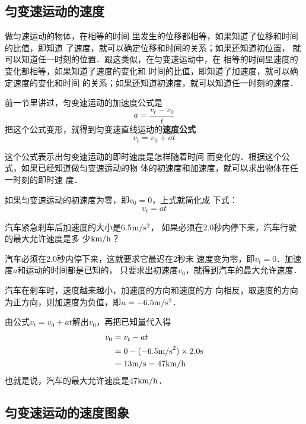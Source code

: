     \subsection{匀变速运动的速度}

做匀速运动的物体，在相等的时间
里发生的位移都相等，如果知道了位移和时间的比值，即知道
了速度，就可以确定位移和时间的关系；如果还知道初位置，
就可以知道任一时刻的位置．跟这类似，在匀变速运动中，在
相等的时间里速度的变化都相等，如果知道了速度的变化和
时间的比值，即知道了加速度，就可以确定速度的变化和时间
的关系；如果还知道初速度，就可以知道任一时刻的速度．

    前一节里讲过，匀变速运动的加速度公式是
\[a=\frac{v_t-v_0}{t} \]
把这个公式变形，就得到匀变速直线运动的\textbf{速度公式}
\[v_t=v_0+at \]

    这个公式表示出匀变速运动的即时速度是怎样随着时间
而变化的．根据这个公式，如果已经知道做匀变速运动的物
体的初速度和加速度，就可以求出物体在任一时刻的即时速
度．

    如果匀变速运动的初速度为零，即$v_0=0$，上式就简化成
下式：
\[v_t=at \]


\begin{example}
汽车紧急刹车后加速度的大小是6.5$\text{m}/\text{s}^2$，
如果必须在2.0秒内停下来，汽车行驶的最大允许速度是多
少$\text{km}/\text{h}$？
\end{example}

\begin{solution}
    汽车必须在2.0秒内停下来，这就要求它最迟在2秒末
速度变为零，即$v_t=0$．加速度$a$和运动的时间都是已知的，
只要求出初速度$v_0$，就得到汽车的最大允许速度．

    汽车在刹车时，速度越来越小，加速度的方向和速度的方
向相反，取速度的方向为正方向，则加速度为负值，即$a=-
6.5\text{m}/\text{s}^2$．

    由公式$v_t=v_0+at$解出$v_0$，再把已知量代入得
\[\begin{split}
v_0&=v_t-at\\
&=0-(-6.5{\rm m/s}^2)\times 2.0{\rm s}\\
&=13{\rm m/s}=47{\rm km/h}
\end{split} \]
也就是说，汽车的最大允许速度是47$\text{km}/\text{h}$．
\end{solution}


\subsection{匀变速运动的速度图象}


